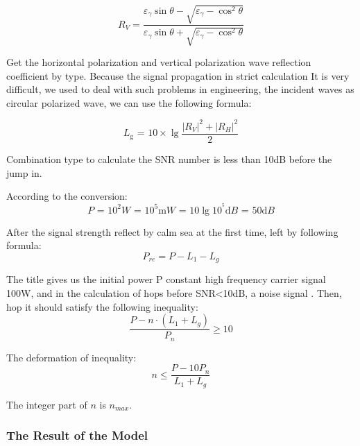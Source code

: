 \documentclass{mcmthesis}
\begin{document}
\begin{equation} \label{6}
{R_V} = \frac{{{\varepsilon _\gamma }\sin \theta  - \sqrt {{\varepsilon _\gamma } - {{\cos }^2}\theta } }}{{{\varepsilon _\gamma }\sin \theta  + \sqrt {{\varepsilon _\gamma } - {{\cos }^2}\theta } }}
\end{equation}

Get the horizontal polarization and vertical polarization wave reflection coefficient by type. Because the signal propagation in strict calculation It is very difficult, we used to deal with such problems in engineering, the incident waves as circular polarized wave, we can use the following formula:

\begin{equation} \label{7}
{L_{\text{g}}}{\text{ = }}10 \times \lg \frac{{{{\left| {{R_V}} \right|}^2} + {{\left| {{R_H}} \right|}^2}}}{2}
\end{equation}

Combination type to calculate the SNR number is less than 10dB before the jump in.

According to the conversion:
\begin{equation} \label{8}
P{\text{ = }}{10^2}W{\text{ = 1}}{{\text{0}}^5}{\text{m}}W{\text{ = }}10\lg {10^{^5}}{\text{d}}B{\text{ = }}50{\text{d}}B
\end{equation}

After the signal strength reflect by calm sea at the first time,  left by following formula:
\begin{equation} \label{9}
{P_{re}} = P - {L_1} - {L_g}
\end{equation}

The title gives us the initial power P constant high frequency carrier signal 100W, and in the calculation of hops before SNR<10dB, a noise signal  . Then, hop it should satisfy the following inequality:
\begin{equation} \label{10}
\frac{{P - n \cdot ({L_1} + {L_g})}}{{{P_n}}} \geqslant 10
\end{equation}

The deformation of inequality:
\begin{equation} \label{11}
n \leqslant \frac{{P - 10{P_n}}}{{{L_1} + {L_g}}}
\end{equation}

The integer part of $n$ is $n_{max}$.

\subsubsection{The Result of the Model}
\end{document}
